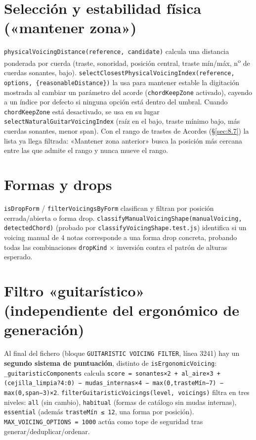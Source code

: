 \documentclass[a4paper,11pt,oneside]{report}
\newcommand{\Sref}[1]{\S\ref{#1}}
\begin{document}
\section{Selección y estabilidad física («mantener zona»)}
\label{sec:8.3}

\lstinline!physicalVoicingDistance(reference, candidate)! calcula una distancia ponderada por cuerda (traste, sonoridad, posición central, traste mín/máx, n\textsuperscript{o} de cuerdas sonantes, bajo). \lstinline!selectClosestPhysicalVoicingIndex(reference,! \lstinline!options, {reasonableDistance})! la usa para mantener estable la digitación mostrada al cambiar un parámetro del acorde (\lstinline!chordKeepZone! activado), cayendo a un índice por defecto si ninguna opción está dentro del umbral. Cuando \lstinline!chordKeepZone! está desactivado, se usa en su lugar \lstinline!selectNaturalGuitarVoicingIndex! (raíz en el bajo, traste mínimo bajo, más cuerdas sonantes, menor span). Con el rango de trastes de Acordes (\Sref{sec:8.7}) la lista ya llega filtrada: «Mantener zona anterior» busca la posición más cercana entre las que admite el rango y nunca mueve el rango.

\section{Formas y drops}
\label{sec:8.4}

\lstinline!isDropForm! / \lstinline!filterVoicingsByForm! clasifican y filtran por posición cerrada/abierta o forma drop. \lstinline!classifyManualVoicingShape(manualVoicing,! \lstinline!detectedChord)! (probado por \lstinline!classifyVoicingShape.test.js!) identifica si un voicing manual de 4 notas corresponde a una forma drop concreta, probando todas las combinaciones \lstinline!dropKind! $\times$ inversión contra el patrón de alturas esperado.

\section{Filtro «guitarístico» (independiente del ergonómico de generación)}
\label{sec:8.5}

Al final del fichero (bloque \lstinline!GUITARISTIC VOICING FILTER!, línea 3241) hay un \textbf{segundo sistema de puntuación}, distinto de \lstinline!isErgonomicVoicing!: \lstinline!_guitaristicComponents! calcula \lstinline!score = sonantes×2 + al_aire×3 + (cejilla_limpia?4:0) − mudas_internas×4 − max(0,trasteMín−7) − max(0,span−3)×2!. \lstinline!filterGuitaristicVoicings(level, voicings)! filtra en tres niveles: \lstinline!all! (sin cambio), \lstinline!habitual! (formas de catálogo sin mudas internas), \lstinline!essential! (además \lstinline!trasteMín ≤ 12!, una forma por posición). \lstinline!MAX_VOICING_OPTIONS = 1000! actúa como tope de seguridad tras generar/deduplicar/ordenar.
\end{document}
